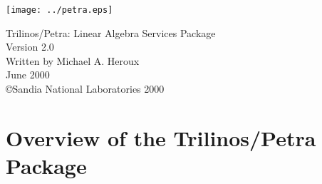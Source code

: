 \documentclass[letterpaper]{book}
\begin{document}
\begin{titlepage}
\texttt{[image: ../petra.eps]}
\begin{center}
{\Huge Trilinos/Petra: Linear Algebra Services Package\\[1ex]\large Version 2.0}\\
\vspace*{1cm}
{\large Written by Michael A. Heroux}\\
\vspace*{0.5cm}
{\small June 2000}\\
\copyright Sandia National Laboratories 2000
\end{center}
\end{titlepage}
\clearemptydoublepage
{}
\tableofcontents
\clearemptydoublepage
{}
\chapter{Overview of the Trilinos/Petra Package}

\end{document}
